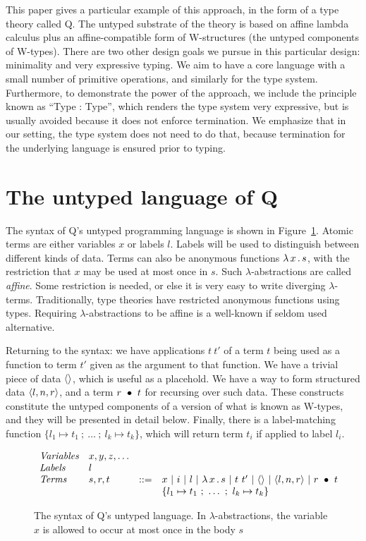 \documentclass{article}
\begin{document}
This paper gives a particular example of this approach, in the form of
a type theory called Q.  The untyped substrate of the theory is based
on affine lambda calculus plus an affine-compatible form of
W-structures (the untyped components of W-types).  There are two other
design goals we pursue in this particular design: minimality and very
expressive typing.  We aim to have a core language with a small number
of primitive operations, and similarly for the type system.
Furthermore, to demonstrate the power of the approach, we include the
principle known as ``Type : Type'', which renders the type system very
expressive, but is usually avoided because it does not enforce
termination.  We emphasize that in our setting, the type system does
not need to do that, because termination for the underlying language
is ensured prior to typing.

\section{The untyped language of Q}

The syntax of Q's untyped programming language is shown in
Figure~\ref{fig:pl}.  Atomic terms are either variables $x$ or labels
$l$.  Labels will be used to distinguish between different kinds of
data.  Terms can also be anonymous functions $\lambda\, x\, .\, s$, with the
restriction that $x$ may be used at most once in $s$.  Such
$\lambda$-abstractions are called \emph{affine}.  Some restriction is
needed, or else it is very easy to write diverging $\lambda$-terms.
Traditionally, type theories have restricted anonymous functions using
types.  Requiring $\lambda$-abstractions to be affine is a well-known
if seldom used alternative.

Returning to the syntax: we have applications $t\ t'$ of a term $t$
being used as a function to term $t'$ given as the argument to that
function.  We have a trivial piece of data $\langle\rangle$, which is useful
as a placehold.  We have a way to form structured data
$\langle l , n, r \rangle$, and a term $r\ \bullet\ t$ for recursing over such
data.  These constructs constitute the untyped components of a version
of what is known as W-types, and they will be presented in detail
below.  Finally, there is a label-matching function $\{ l_1 \mapsto
t_1\ ;\ \ldots\ ;\ l_k\mapsto t_k \}$, which will return term $t_i$ if
applied to label $l_i$.


\begin{figure}
  \[
  \begin{array}{llll}
    \textit{Variables}  & x,y,z,\ldots & \ &\ \\
    \textit{Labels}  & l & \ &\ \\ 
    \textit{Terms} & s,r,t & ::= & x\ |\ i\ |\ l\ |\ \lam{x}{s}\ |\ t\ t'\ |\ \wunit\ |\ \ctor{l}{n}{r}\ |\ \wrec{r}{t} \\
    \ &\ &\ & \{ l_1 \mapsto t_1\ ;\ \ldots\ ;\ l_k\mapsto t_k \}
  \end{array}
\]
\caption{The syntax of Q's untyped language.  In $\lambda$-abstractions, the variable $x$ is allowed
  to occur at most once in the body $s$}
\label{fig:pl}
\end{figure}
\end{document}
